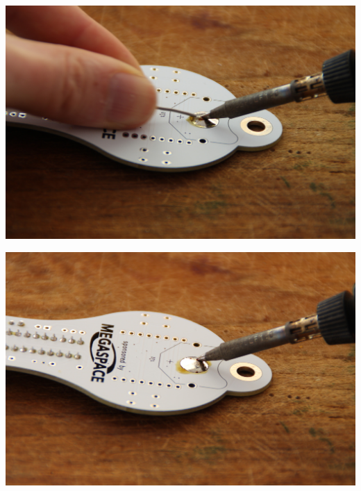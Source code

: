 \documentclass{article}
\begin{document}
\begin{minipage}[b]{0.5\textwidth}
	\includegraphics[width=\textwidth]{Bilder2023/IMG_8358.JPG}
\end{minipage}
\begin{minipage}[b]{0.5\textwidth}
	\includegraphics[width=\textwidth]{Bilder2023/IMG_8359.JPG}
\end{minipage}

\vspace{0.5cm}
\end{document}
